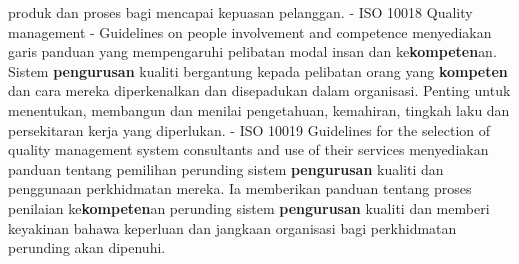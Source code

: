 \documentclass{article}
\begin{document}
 produk dan proses bagi mencapai kepuasan pelanggan.
- ISO 10018 Quality management - Guidelines on people involvement and competence
 menyediakan garis panduan yang mempengaruhi pelibatan modal insan dan
 ke\textbf{kompeten}an. Sistem \textbf{pengurusan} kualiti bergantung kepada pelibatan orang yang
 \textbf{kompeten} dan cara mereka diperkenalkan dan disepadukan dalam organisasi. Penting
 untuk menentukan, membangun dan menilai pengetahuan, kemahiran, tingkah laku dan
 persekitaran kerja yang diperlukan.
- ISO 10019 Guidelines for the selection of quality management system consultants and
 use of their services menyediakan panduan tentang pemilihan perunding sistem
 \textbf{pengurusan} kualiti dan penggunaan perkhidmatan mereka. Ia memberikan panduan
 tentang proses penilaian ke\textbf{kompeten}an perunding sistem \textbf{pengurusan} kualiti dan
 memberi keyakinan bahawa keperluan dan jangkaan organisasi bagi perkhidmatan
 perunding akan dipenuhi.
\end{document}
